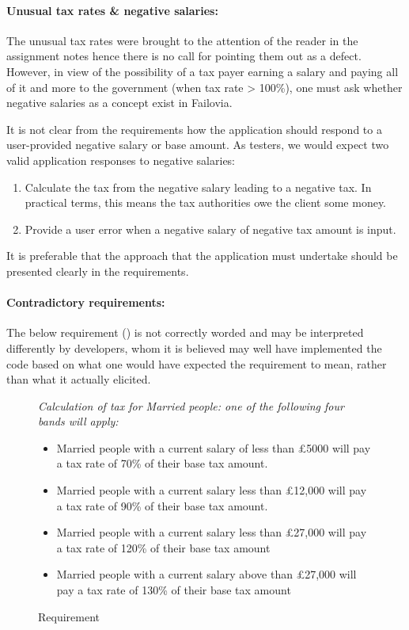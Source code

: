 \paragraph{Unusual tax rates \& negative salaries:}
The unusual tax rates were brought to the attention of the reader in the assignment notes hence there is no call for pointing them out as a defect. However, in view of the possibility of a tax payer earning a salary and paying all of it and more to the government (when tax rate > 100\%), one must ask whether negative salaries as a concept exist in Failovia. 
\par
It is not clear from the requirements how the application should respond to a user-provided negative salary or base amount. As testers, we would expect two valid application responses to negative salaries: 

\begin{enumerate}
	\item Calculate the tax from the negative salary leading to a negative tax. In practical terms, this means the tax authorities owe the client some money.
	\item Provide a user error when a negative salary of negative tax amount is input. 
\end{enumerate}

It is preferable that the approach that the application must undertake should be presented clearly in the requirements.

\paragraph{Contradictory requirements:}
The below requirement (\REightFive) is not correctly worded and may be interpreted differently by developers, whom it is believed may well have implemented the code based on what one would have expected the requirement to mean, rather than what it actually elicited. 
\par
\begin{figure}[H]
\begin{mdframed}
{
\it
\footnotesize
Calculation of tax for Married people: one of the following four bands will apply:
\begin{itemize}
	\item Married people with a current salary of less than £5000 will pay a tax rate of
	70\% of their base tax amount.
	\item Married people with a current salary less than £12,000 will pay a tax rate of
	90\% of their base tax amount.
	\item Married people with a current salary less than £27,000 will pay a tax rate of
	120\% of their base tax amount
	\item Married people with a current salary above than £27,000 will pay a tax rate
	of 130\% of their base tax amount
\end{itemize}	
}
\end{mdframed}
\caption{Requirement \REightFive}
\end{figure} 


